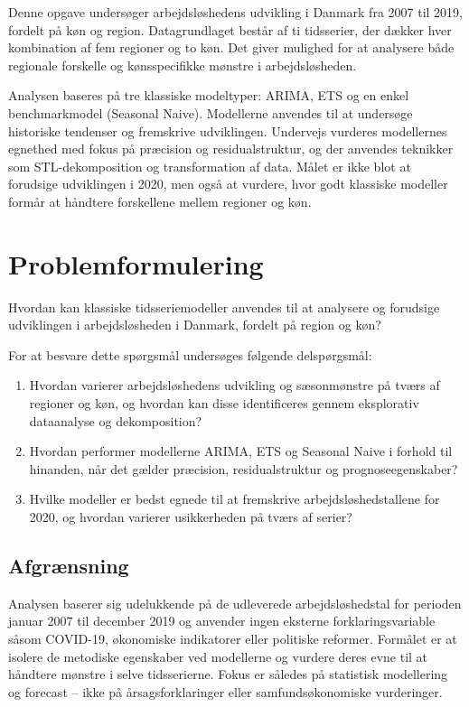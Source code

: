 \documentclass[
]{article}
\begin{document}
Denne opgave undersøger arbejdsløshedens udvikling i Danmark fra 2007
til 2019, fordelt på køn og region. Datagrundlaget består af ti
tidsserier, der dækker hver kombination af fem regioner og to køn. Det
giver mulighed for at analysere både regionale forskelle og
kønsspecifikke mønstre i arbejdsløsheden.

Analysen baseres på tre klassiske modeltyper: ARIMA, ETS og en enkel
benchmarkmodel (Seasonal Naive). Modellerne anvendes til at undersøge
historiske tendenser og fremskrive udviklingen. Undervejs vurderes
modellernes egnethed med fokus på præcision og residualstruktur, og der
anvendes teknikker som STL-dekomposition og transformation af data.
Målet er ikke blot at forudsige udviklingen i 2020, men også at vurdere,
hvor godt klassiske modeller formår at håndtere forskellene mellem
regioner og køn.

\section{Problemformulering}\label{problemformulering}

Hvordan kan klassiske tidsseriemodeller anvendes til at analysere og
forudsige udviklingen i arbejdsløsheden i Danmark, fordelt på region og
køn?

For at besvare dette spørgsmål undersøges følgende delspørgsmål:

\begin{enumerate}
\def\labelenumi{\arabic{enumi}.}
\item
  Hvordan varierer arbejdsløshedens udvikling og sæsonmønstre på tværs
  af regioner og køn, og hvordan kan disse identificeres gennem
  eksplorativ dataanalyse og dekomposition?
\item
  Hvordan performer modellerne ARIMA, ETS og Seasonal Naive i forhold
  til hinanden, når det gælder præcision, residualstruktur og
  prognoseegenskaber?
\item
  Hvilke modeller er bedst egnede til at fremskrive
  arbejdsløshedstallene for 2020, og hvordan varierer usikkerheden på
  tværs af serier?
\end{enumerate}

\subsection{Afgrænsning}\label{afgruxe6nsning}

Analysen baserer sig udelukkende på de udleverede arbejdsløshedstal for
perioden januar 2007 til december 2019 og anvender ingen eksterne
forklaringsvariable såsom COVID-19, økonomiske indikatorer eller
politiske reformer. Formålet er at isolere de metodiske egenskaber ved
modellerne og vurdere deres evne til at håndtere mønstre i selve
tidsserierne. Fokus er således på statistisk modellering og forecast --
ikke på årsagsforklaringer eller samfundsøkonomiske vurderinger.
\end{document}
